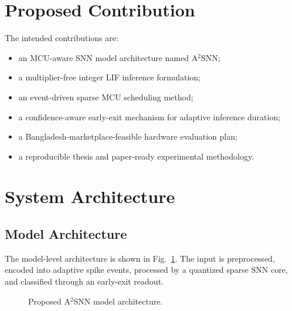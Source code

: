 \documentclass[12pt]{article}
\newcommand{\modelname}{A$^2$SNN}
\begin{document}
\section{Proposed Contribution}
The intended contributions are:
\begin{itemize}
    \item an MCU-aware SNN model architecture named \modelname;
    \item a multiplier-free integer LIF inference formulation;
    \item an event-driven sparse MCU scheduling method;
    \item a confidence-aware early-exit mechanism for adaptive inference duration;
    \item a Bangladesh-marketplace-feasible hardware evaluation plan;
    \item a reproducible thesis and paper-ready experimental methodology.
\end{itemize}

\section{System Architecture}
\subsection{Model Architecture}
The model-level architecture is shown in Fig.~\ref{fig:proposal_model}. The input is preprocessed, encoded into adaptive spike events, processed by a quantized sparse SNN core, and classified through an early-exit readout.

\begin{figure}[h]
\centering
{}
\caption{Proposed \modelname{} model architecture.}
\label{fig:proposal_model}
\end{figure}
\end{document}
